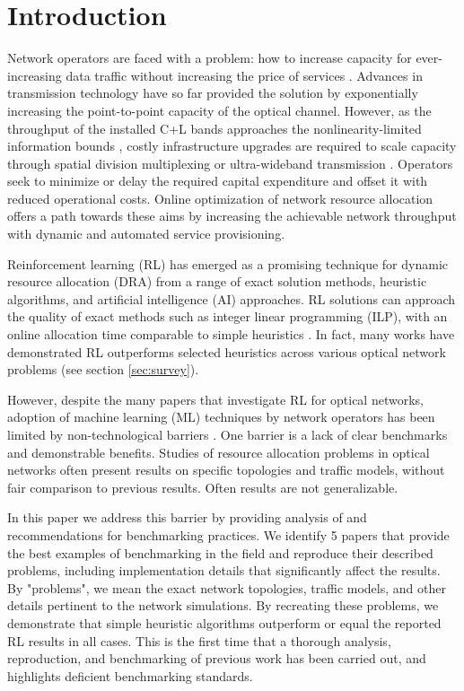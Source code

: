\section{Introduction}


Network operators are faced with a problem: how to increase capacity for ever-increasing data traffic without increasing the price of services \cite{lord_future_2021}. Advances in transmission technology have so far provided the solution by exponentially increasing the point-to-point capacity of the optical channel. However, as the throughput of the installed C+L bands approaches the nonlinearity-limited information bounds \cite{shtaif_information_2024}, costly infrastructure upgrades are required to scale capacity through spatial division multiplexing or ultra-wideband transmission \cite{winzer_future_2023}. Operators seek to minimize or delay the required capital expenditure and offset it with reduced operational costs. Online optimization of network resource allocation offers a path towards these aims by increasing the achievable network throughput with dynamic and automated service provisioning. 

Reinforcement learning (RL) has emerged as a promising technique for dynamic resource allocation (DRA) from a range of exact solution methods, heuristic algorithms, and artificial intelligence (AI) approaches.  RL solutions can approach the quality of exact methods such as integer linear programming (ILP), with an online allocation time comparable to simple heuristics \cite{di_cicco_deep_2022}. In fact, many works have demonstrated RL outperforms selected heuristics across various optical network problems %
 (see section \ref{sec:survey}).

However, despite the many papers that investigate RL for optical networks, adoption of machine learning (ML) techniques by network operators has been limited by non-technological barriers \cite{khan_non-technological_2024}. One barrier is a lack of clear benchmarks and demonstrable benefits. Studies of resource allocation problems in optical networks often present results on specific topologies and traffic models, without fair comparison to previous results. Often results are not generalizable.

In this paper we address this barrier by providing analysis of and recommendations for benchmarking practices. We identify 5 papers that provide the best examples of benchmarking in the field and reproduce their described problems, including implementation details that significantly affect the results. By "problems", we mean the exact network topologies, traffic models, and other details pertinent to the network simulations. By recreating these problems, we demonstrate that simple heuristic algorithms outperform or equal the reported RL results in all cases. This is the first time that a thorough analysis, reproduction, and benchmarking of previous work has been carried out, and highlights deficient benchmarking standards. 

